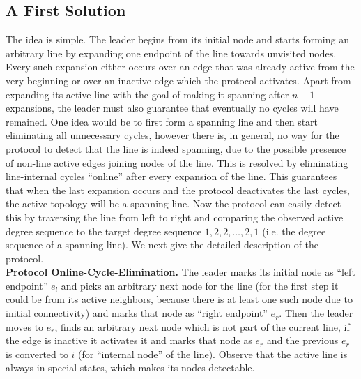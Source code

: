 \documentclass[preprint]{elsarticle}
\begin{document}
\subsection{A First Solution}
\label{subsec:cycle-elimination}

The idea is simple. The leader begins from its initial node and starts forming an arbitrary line by expanding one endpoint of the line towards unvisited nodes. Every such expansion either occurs over an edge that was already active from the very beginning or over an inactive edge which the protocol activates. Apart from expanding its active line with the goal of making it spanning after $n-1$ expansions, the leader must also guarantee that eventually no cycles will have remained. One idea would be to first form a spanning line and then start eliminating all unnecessary cycles, however there is, in general, no way for the protocol to detect that the line is indeed spanning, due to the possible presence of non-line active edges joining nodes of the line. This is resolved by eliminating line-internal cycles ``online'' after every expansion of the line. This guarantees that when the last expansion occurs and the protocol deactivates the last cycles, the active topology will be a spanning line. Now the protocol can easily detect this by traversing the line from left to right and comparing the observed active degree sequence to the target degree sequence $1,2,2,\ldots,2,1$ (i.e. the degree sequence of a spanning line). We next give the detailed description of the protocol.\\  

\noindent\textbf{Protocol Online-Cycle-Elimination.} The leader marks its initial node as ``left endpoint'' $e_l$ and picks an arbitrary next node for the line (for the first step it could be from its active neighbors, because there is at least one such node due to initial connectivity) and marks that node as ``right endpoint'' $e_r$. Then the leader moves to $e_r$, finds an arbitrary next node which is not part of the current line, if the edge is inactive it activates it and marks that node as $e_r$ and the previous $e_r$ is converted to $i$ (for ``internal node'' of the line). Observe that the active line is always in special states, which makes its nodes detectable.
\end{document}
